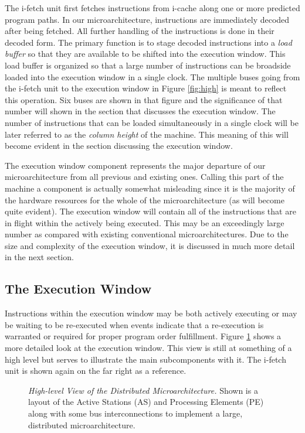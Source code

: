 \documentclass[10pt,dvips]{article}
\begin{document}
The i-fetch unit first fetches instructions from i-cache
along one or more predicted program paths.
In our microarchitecture, instructions are immediately
decoded after being fetched.
All further handling of the instructions is done in their decoded
form.
The primary function is to stage decoded instructions 
into a \textit{load buffer}
so that they are available to be shifted into the execution
window.  This load buffer is organized so that
a large number of instructions can be broadside loaded into the
execution window in a single clock.
The multiple buses going from the i-fetch unit to the
execution window in Figure \ref{fig:high} is meant to
reflect this operation.  Six buses are shown in that figure
and the significance of that number will shown in the
section that discusses the execution window.
The number of instructions that can be loaded simultaneously
in a single clock will be later referred to as 
the \textit{column height} of the machine.  This meaning
of this will become
evident in the section discussing the execution window.

The execution window component 
represents the major departure of our microarchitecture
from all previous and existing ones.
Calling this part of the machine a component is actually somewhat
misleading since it is the majority of the hardware resources
for the whole of the microarchitecture (as will become quite evident).
The execution window will contain all of the instructions
that are in flight within the actively being executed.  This may be an
exceedingly large number as compared with 
existing conventional microarchitectures.
Due to the size and complexity of the execution window, it is
discussed in much more detail in the next section.
%
\subsection{The Execution Window}
%
Instructions within the execution window may be both actively 
executing
or may be waiting to be re-executed when events indicate that
a re-execution is warranted or required for proper program order
fulfillment.
Figure \ref{fig:window} shows a more detailed look
at the execution window.
This view is still at something of a high level but serves to
illustrate the main subcomponents with it.
The i-fetch unit is shown again on the far right as a reference.
%
\begin{figure}
\centering
{}
\caption{{\em High-level View of the Distributed Microarchitecture.} 
Shown is a layout of the Active Stations (AS) and Processing Elements (PE)
along with some bus interconnections to implement a large,
distributed microarchitecture.}
\label{fig:window}
\end{figure}
\end{document}
